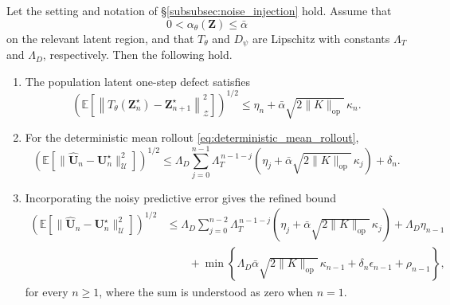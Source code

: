 \documentclass[11pt]{article}
\begin{document}
\begin{proposition}
\label{prop:population_kl_rollout}
Let the setting and notation of \S\ref{subsubsec:noise_injection} hold. Assume that
\[
    0<\alpha_\theta(\mathbf Z)\leq\bar\alpha
\]
on the relevant latent region, and that $T_\theta$ and $D_\psi$ are Lipschitz with constants $\Lambda_T$ and $\Lambda_D$, respectively. Then the following hold.

\begin{enumerate}[label=(\alph*),topsep=0pt,itemsep=3pt]

\item
The population latent one-step defect satisfies
\begin{equation}
    \left(
        \mathbb E
        \left[
            \left\|
                T_\theta(\mathbf Z_n^\star)
                -
                \mathbf Z_{n+1}^\star
            \right\|_{\mathcal Z}^2
        \right]
    \right)^{1/2}
    \leq
    \eta_n+\bar\alpha\sqrt{2\|K\|_{\mathrm{op}}}\,\kappa_n.
    \label{eq:population_latent_one_step}
\end{equation}

\item
For the deterministic mean rollout
\eqref{eq:deterministic_mean_rollout},
\begin{equation}
    \left(
        \mathbb E
        \left[
            \|\widehat{\mathbf U}_n-\mathbf U_n^\star\|_{\mathcal U}^2
        \right]
    \right)^{1/2}
    \leq\Lambda_D
    \sum_{j=0}^{n-1}\Lambda_T^{\,n-1-j}\left(\eta_j+\bar\alpha\sqrt{2\|K\|_{\mathrm{op}}}\,\kappa_j
    \right)
    +
    \delta_n.
    \label{eq:population_kl_physical_rollout}
\end{equation}

\item
Incorporating the noisy predictive error gives the refined bound
\begin{equation}
\begin{aligned}
\left(\mathbb E\left[\|\widehat{\mathbf U}_n-\mathbf U_n^\star\|_{\mathcal U}^2\right]\right)^{1/2}
&\leq\Lambda_D
    \sum_{j=0}^{n-2}
    \Lambda_T^{\,n-1-j}\left(\eta_j+\bar\alpha\sqrt{2\|K\|_{\mathrm{op}}}\,\kappa_j\right)+\Lambda_D\eta_{n-1}
    \\
    &\qquad
    +\min\left\{ \Lambda_D\bar\alpha\sqrt{2\|K\|_{\mathrm{op}}}\,\kappa_{n-1}+\delta_n\epsilon_{n-1}+\rho_{n-1}\right\},
\end{aligned}
\label{eq:population_refined_rollout}
\end{equation}
for every $n\geq 1$, where the sum is understood as zero when $n=1$.
\end{enumerate}
\end{proposition}
\end{document}
